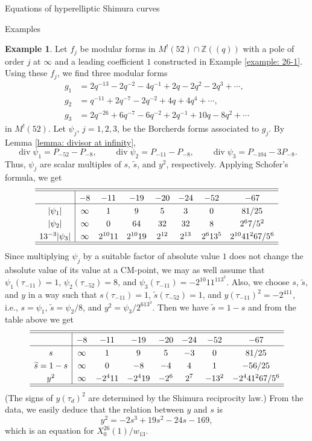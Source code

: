 \documentclass{amsart}
\newcounter{lemma}
\theoremstyle{definition}
\newtheorem{Example}[lemma]{Example}
\def\Z{\mathbb Z}
\def\wt{\widetilde}
\def\div{\operatorname{div}}
\begin{document}
\begin{section}{Equations of hyperelliptic Shimura curves}
\begin{subsection}{Examples}
\begin{Example}
  Let $f_j$ be modular forms in $M^!(52)\cap\Z((q))$ with a pole of
  order $j$ at $\infty$ and a leading coefficient $1$ constructed in
  Example \ref{example: 26-1}. Using these $f_j$, we find three
  modular forms
  \begin{equation*}
  \begin{split}
    g_1&=2q^{-13}-2q^{-2}-4q^{-1}+2q-2q^2-2q^3+\cdots, \\
    g_2&=q^{-11}+2q^{-7}-2q^{-2}+4q+4q^4+\cdots, \\
    g_3&=2q^{-26}+6q^{-7}-6q^{-2}+2q^{-1}+10q-8q^2+\cdots
  \end{split}
  \end{equation*}
  in $M^!(52)$. Let $\psi_j$, $j=1,2,3$, be the Borcherds forms
  associated to $g_j$. By Lemma \ref{lemma: divisor at infinity},
  $$
    \div\psi_1=P_{-52}-P_{-8}, \qquad
    \div\psi_2=P_{-11}-P_{-8}, \qquad
    \div\psi_3=P_{-104}-3P_{-8}.
  $$
  Thus, $\psi_j$ are scalar multiples of $s$, $\wt s$, and $y^2$,
  respectively. Applying Schofer's formula, we get
  $$ \extrarowheight3pt
  \begin{array}{c|ccccccc} \hline\hline
    & -8 & -11 & -19 & -20 & -24 & -52 & -67 \\ \hline
  |\psi_1| & \infty & 1 & 9 & 5 & 3 & 0 & 81/25 \\
  |\psi_2| & \infty & 0 & 64 & 32 & 32 & 8 & 2^67/5^2 \\
  13^{-3}|\psi_3| & \infty & 2^{10}11 & 2^{10}19 & 2^{12} & 2^{13}
   & 2^613^5 & 2^{10}41^267/5^6 \\ \hline\hline
  \end{array}
  $$
  Since multiplying $\psi_j$ by a suitable factor of absolute value
  $1$ does not change the absolute value of its value at a CM-point,
  we may as well assume that $\psi_1(\tau_{-11})=1$,
  $\psi_2(\tau_{-52})=8$, and $\psi_3(\tau_{-11})=-2^{10}11^113^3$.
  Also, we choose $s$, $\wt s$, and $y$ in a way such that
  $s(\tau_{-11})=1$, $\wt s(\tau_{-52})=1$, and
  $y(\tau_{-11})^2=-2^411$, i.e., $s=\psi_1$, $\wt s=\psi_2/8$, and
  $y^2=\psi_3/2^613^3$. Then we have $\wt s=1-s$ and from the table
  above we get
  $$ \extrarowheight3pt
  \begin{array}{c|ccccccc} \hline\hline
    & -8 & -11 & -19 & -20 & -24 & -52 & -67 \\ \hline
  s & \infty & 1 & 9 & 5 & -3 & 0 & 81/25 \\
  \wt s=1-s & \infty & 0 & -8 & -4 & 4 & 1 & -56/25 \\
  y^2 & \infty & -2^411 & -2^419 & -2^6 & 2^7 & -13^2 & -2^441^267/5^6
    \\ \hline\hline
  \end{array}
  $$
  (The signs of $y(\tau_d)^2$ are determined by the Shimura reciprocity
  law.) From the data, we easily deduce that the relation between $y$
  and $s$ is
  $$
    y^2=-2s^3+19s^2-24s-169,
  $$
  which is an equation for $X_0^{26}(1)/w_{13}$.


\end{Example}
\end{subsection}
\end{section}
\end{document}
